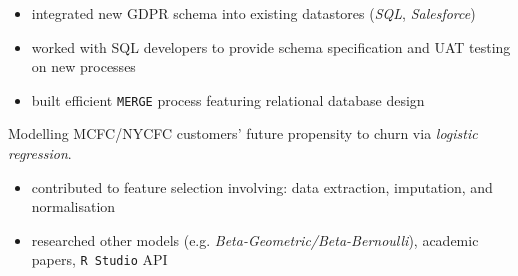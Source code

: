 \documentclass[letterpaper,11pt]{article}
\begin{document}
\begin{description}[style=multiline,leftmargin=3cm]
\begin{description}[style=multiline,leftmargin=2.5cm]
	      \end{description}
	\item[GDPR Pipeline]
	      \begin{itemize}
		      \item integrated new GDPR schema into existing datastores (\textit{SQL}, \textit{Salesforce})
		      \item worked with SQL developers to provide schema specification and UAT testing on new processes
		      \item built efficient \texttt{MERGE} process featuring relational database design
	      \end{itemize}
	\item[Customer Churn Model]
	      Modelling MCFC/NYCFC customers' future propensity to churn via \textit{logistic regression}.
	      \begin{itemize}
		      \item contributed to feature selection involving: data extraction, imputation, and normalisation
		      \item researched other models (e.g. \textit{Beta-Geometric/Beta-Bernoulli}), academic papers, \texttt{R Studio} API
	      \end{itemize}
\end{description}
\end{document}
